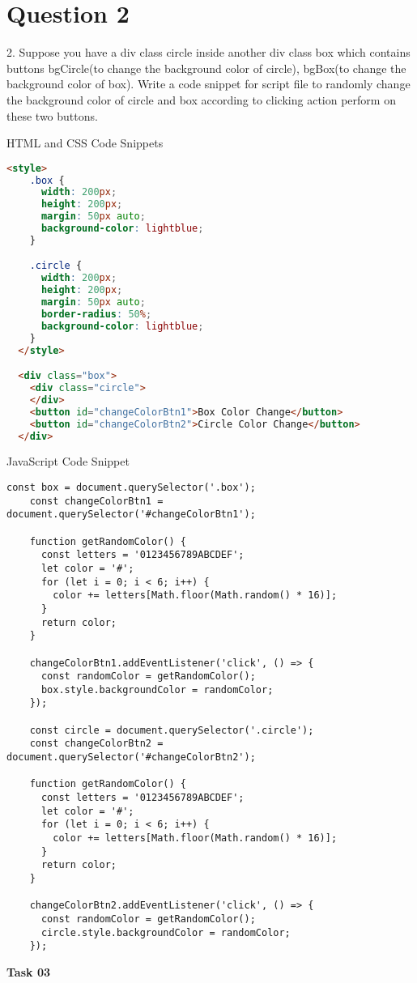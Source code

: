 \documentclass{article}
\begin{document}
\section*{Question 2}
2. Suppose you have a div class circle inside another div class box which contains buttons
bgCircle(to change the background color of circle), bgBox(to change the background color of
box). Write a code snippet for script file to randomly change the background color of circle
and box according to clicking action perform on these two buttons.

\vspace{2\baselineskip}
HTML and CSS Code Snippets
\begin{lstlisting}[language=HTML]
  <style>
    .box {
      width: 200px;
      height: 200px;
      margin: 50px auto;
      background-color: lightblue;
    }

    .circle {
      width: 200px;
      height: 200px;
      margin: 50px auto;
      border-radius: 50%;
      background-color: lightblue;
    }
  </style>

  <div class="box">
    <div class="circle">
    </div>
    <button id="changeColorBtn1">Box Color Change</button>
    <button id="changeColorBtn2">Circle Color Change</button>
  </div>
\end{lstlisting}
\vspace{19\baselineskip}
JavaScript Code Snippet
\begin{lstlisting}[caption=JS Task 02 (ii)]
    const box = document.querySelector('.box');
    const changeColorBtn1 = document.querySelector('#changeColorBtn1');

    function getRandomColor() {
      const letters = '0123456789ABCDEF';
      let color = '#';
      for (let i = 0; i < 6; i++) {
        color += letters[Math.floor(Math.random() * 16)];
      }
      return color;
    }

    changeColorBtn1.addEventListener('click', () => {
      const randomColor = getRandomColor();
      box.style.backgroundColor = randomColor;
    });

    const circle = document.querySelector('.circle');
    const changeColorBtn2 = document.querySelector('#changeColorBtn2');

    function getRandomColor() {
      const letters = '0123456789ABCDEF';
      let color = '#';
      for (let i = 0; i < 6; i++) {
        color += letters[Math.floor(Math.random() * 16)];
      }
      return color;
    }

    changeColorBtn2.addEventListener('click', () => {
      const randomColor = getRandomColor();
      circle.style.backgroundColor = randomColor;
    });
      \end{lstlisting}
\vspace{15\baselineskip}
\textbf{\Large Task 03}
\vspace{2\baselineskip}
\end{document}
